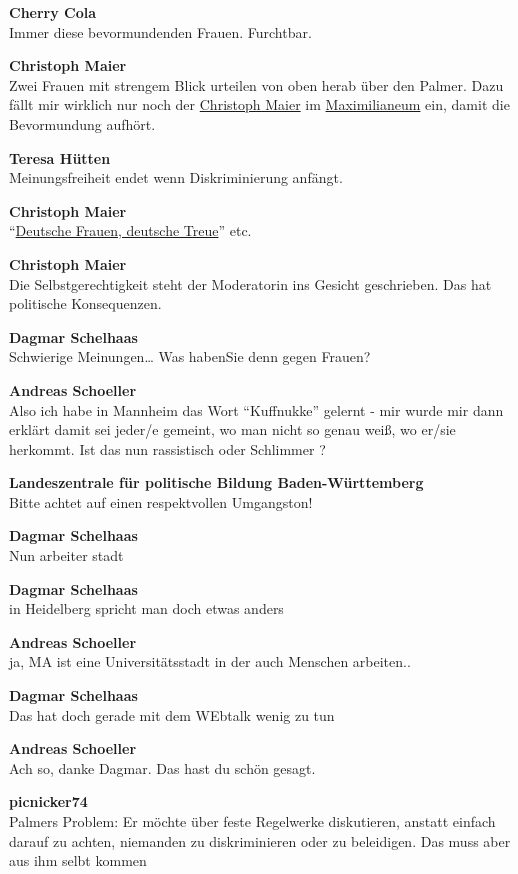 \documentclass[]{article}
\begin{document}
\textbf{Cherry Cola}\\
​Immer diese bevormundenden Frauen. Furchtbar.

\textbf{Christoph Maier}\\
​Zwei Frauen mit strengem Blick urteilen von oben herab über den Palmer.
Dazu fällt mir wirklich nur noch der
\protect\hyperlink{Christoph-Maier-MdL}{Christoph Maier} im
\protect\hyperlink{Maximilianeum}{Maximilianeum} ein, damit die
Bevormundung aufhört.

\textbf{Teresa Hütten}\\
​Meinungsfreiheit endet wenn Diskriminierung anfängt.

\textbf{Christoph Maier}\\
​``\protect\hyperlink{Deutsche-Frauen}{Deutsche Frauen, deutsche
Treue}'' etc.

\textbf{Christoph Maier}\\
​Die Selbstgerechtigkeit steht der Moderatorin ins Gesicht geschrieben.
Das hat politische Konsequenzen.

\textbf{Dagmar Schelhaas}\\
​Schwierige Meinungen\ldots{} Was habenSie denn gegen Frauen?

\textbf{Andreas Schoeller}\\
​Also ich habe in Mannheim das Wort ``Kuffnukke'' gelernt - mir wurde
mir dann erklärt damit sei jeder/e gemeint, wo man nicht so genau weiß,
wo er/sie herkommt. Ist das nun rassistisch oder Schlimmer ?

\textbf{Landeszentrale für politische Bildung Baden-Württemberg}\\
​Bitte achtet auf einen respektvollen Umgangston!

\textbf{Dagmar Schelhaas}\\
​Nun arbeiter stadt

\textbf{Dagmar Schelhaas}\\
​in Heidelberg spricht man doch etwas anders

\textbf{Andreas Schoeller}\\
​ja, MA ist eine Universitätsstadt in der auch Menschen arbeiten..

\textbf{Dagmar Schelhaas}\\
​Das hat doch gerade mit dem WEbtalk wenig zu tun

\textbf{Andreas Schoeller}\\
​Ach so, danke Dagmar. Das hast du schön gesagt.

\textbf{picnicker74}\\
​Palmers Problem: Er möchte über feste Regelwerke diskutieren, anstatt
einfach darauf zu achten, niemanden zu diskriminieren oder zu
beleidigen. Das muss aber aus ihm selbt kommen
\end{document}
